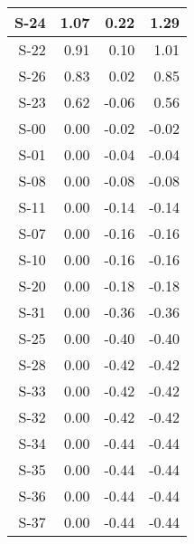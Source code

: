 \begin{tabular}{ | r | r | r | r | }
    \hline
                  S-24  &            1.07  &            0.22  &            1.29  \\
    \hline
                  S-22  &            0.91  &            0.10  &            1.01  \\
    \hline
                  S-26  &            0.83  &            0.02  &            0.85  \\
    \hline
                  S-23  &            0.62  &           -0.06  &            0.56  \\
    \hline
                  S-00  &            0.00  &           -0.02  &           -0.02  \\
    \hline
                  S-01  &            0.00  &           -0.04  &           -0.04  \\
    \hline
                  S-08  &            0.00  &           -0.08  &           -0.08  \\
    \hline
                  S-11  &            0.00  &           -0.14  &           -0.14  \\
    \hline
                  S-07  &            0.00  &           -0.16  &           -0.16  \\
    \hline
                  S-10  &            0.00  &           -0.16  &           -0.16  \\
    \hline
                  S-20  &            0.00  &           -0.18  &           -0.18  \\
    \hline
                  S-31  &            0.00  &           -0.36  &           -0.36  \\
    \hline
                  S-25  &            0.00  &           -0.40  &           -0.40  \\
    \hline
                  S-28  &            0.00  &           -0.42  &           -0.42  \\
    \hline
                  S-33  &            0.00  &           -0.42  &           -0.42  \\
    \hline
                  S-32  &            0.00  &           -0.42  &           -0.42  \\
    \hline
                  S-34  &            0.00  &           -0.44  &           -0.44  \\
    \hline
                  S-35  &            0.00  &           -0.44  &           -0.44  \\
    \hline
                  S-36  &            0.00  &           -0.44  &           -0.44  \\
    \hline
                  S-37  &            0.00  &           -0.44  &           -0.44  \\

\end{tabular}
